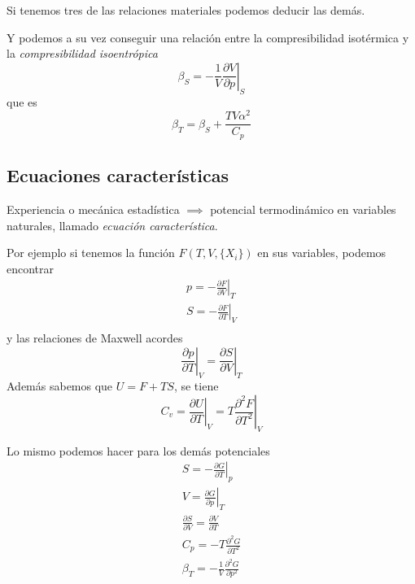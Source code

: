 \documentclass{book}
\numberwithin{equation}{section} %
\begin{document}
Si tenemos tres de las relaciones materiales podemos deducir las demás.

Y podemos a su vez conseguir una relación entre la compresibilidad isotérmica y la \emph{compresibilidad isoentrópica}
\begin{equation}
\beta_S = - \frac{1}{V} \left. \frac{\partial V}{\partial p}\right|_S
\end{equation}
que es
\begin{equation}
\beta_T = \beta_S + \frac{T V \alpha^2}{C_p}
\end{equation}

\subsection{Ecuaciones características}
Experiencia o mecánica estadística $\implies$ potencial termodinámico en variables naturales, llamado \emph{ecuación característica}.

Por ejemplo si tenemos la función $F(T,V,\{X_i\})$ en sus variables, podemos encontrar
\begin{equation}
\begin{gathered}
p = - \left.\frac{\partial F}{\partial V}\right|_{T}\\
S = - \left.\frac{\partial F}{\partial T}\right|_{V}\\
\end{gathered}
\end{equation}
y las relaciones de Maxwell acordes
\begin{equation}
\left.\frac{\partial p}{\partial T}\right|_V = \left.\frac{\partial S}{\partial V}\right|_T
\end{equation}
Además sabemos que $U = F + TS$, se tiene
\begin{equation}
C_v = \left.\frac{\partial U}{\partial T}\right|_V = T \left.\frac{\partial^2 F}{\partial T^2}\right|_V
\end{equation}

Lo mismo podemos hacer para los demás potenciales
\begin{equation}
\begin{gathered}
    S = - \left.\frac{\partial G}{\partial T}\right|_p\\
    V = \left.\frac{\partial G}{\partial p}\right|_T\\
    \frac{\partial S}{\partial V} = \frac{\partial V}{\partial T}\\
    C_p = -T \frac{\partial^2 G}{\partial T^2}\\
    \beta_T = - \frac{1}{V} \frac{\partial^2 G}{\partial p^2}
\end{gathered}
\end{equation}
\end{document}
